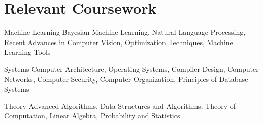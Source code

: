 
\section{Relevant Coursework}
\cvitem
    {Machine Learning} %
    {Bayesian Machine Learning, Natural Language Processing, Recent Advances in Computer Vision, Optimization Techniques, Machine Learning Tools}
    

\cvitem
    {Systems} %
    {Computer Architecture, Operating Systems, Compiler Design, Computer Networks, Computer Security, Computer Organization, Principles of Database Systems}
    
 
\cvitem
	{Theory} %
	{Advanced Algorithms, Data Structures and Algorithms, Theory of Computation, Linear Algebra, Probability and Statistics}
